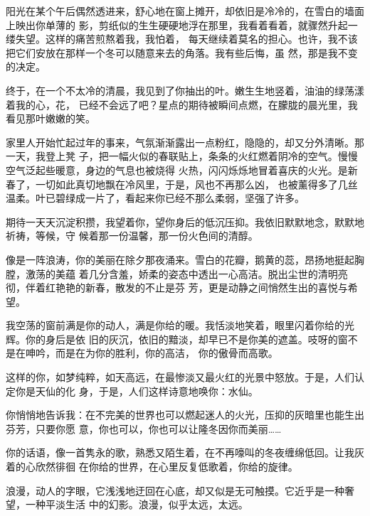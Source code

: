 		阳光在某个午后偶然透进来，舒心地在窗上摊开，却依旧是冷冷的，在雪白的墙面上映出你单薄的
	影，剪纸似的生生硬硬地浮在那里，我看着看着，就骤然升起一缕失望。这样的痛苦煎熬着我，我怕着，
	每天继续着莫名的担心。也许，我不该把它们安放在那样一个冬可以随意来去的角落。我有些后悔，虽
	然，那是我不变的决定。

		终于，在一个不太冷的清晨，我见到了你抽出的叶。嫩生生地竖着，油油的绿荡漾着我的心，花，
	已经不会远了吧？星点的期待被瞬间点燃，在朦胧的晨光里，我看见那叶嫩嫩的笑。

		家里人开始忙起过年的事来，气氛渐渐露出一点粉红，隐隐的，却又分外清晰。那一天，我登上凳
	子，把一幅火似的春联贴上，条条的火红燃着阴冷的空气。慢慢空气泛起些暖意，身边的气息也被烧得
	火热，闪闪烁烁地冒着喜庆的火光。是新春了，一切如此真切地飘在冷风里，于是，风也不再那么凶，
	也被薰得多了几丝温柔。叶已碧绿成一片了，看起来你已经不那么柔弱，坚强了许多。

		期待一天天沉淀积攒，我望着你，望你身后的低沉压抑。我依旧默默地念，默默地祈祷，等候，守
	候着那一份温馨，那一份火色间的清醇。

		像是一阵浪涛，你的美丽在除夕那夜涌来。雪白的花瓣，鹅黄的蕊，昂扬地挺起胸膛，激荡的美蕴
	着几分含羞，娇柔的姿态中透出一心高洁。脱出尘世的清明亮彻，伴着红艳艳的新春，散发的不止是芬
	芳，更是动静之间悄然生出的喜悦与希望。

		我空荡的窗前满是你的动人，满是你给的暖。我恬淡地笑着，眼里闪着你给的光辉。你的身后是依
	旧的灰沉，依旧的黯淡，却早已不是你美的遮盖。吱呀的窗不是在呻吟，而是在为你的胜利，你的高洁，
	你的傲骨而高歌。

		这样的你，如梦纯粹，如天高远，在最惨淡又最火红的光景中怒放。于是，人们认定你是天仙的化
	身，于是，人们这样诗意地唤你：水仙。

		你悄悄地告诉我：在不完美的世界也可以燃起迷人的火光，压抑的灰暗里也能生出芬芳，只要你愿
	意，你也可以，你也可以让隆冬因你而美丽……

		你的话语，像一首隽永的歌，熟悉又陌生着，在不再嚎叫的冬夜缠绵低回。让我灰着的心欣然徘徊
	在你给的世界，在心里反复低歌着，你给的旋律。

	\endwriting



		浪漫，动人的字眼，它浅浅地迂回在心底，却又似是无可触摸。它近乎是一种奢望，一种平淡生活
	中的幻影。浪漫，似乎太远，太远。


